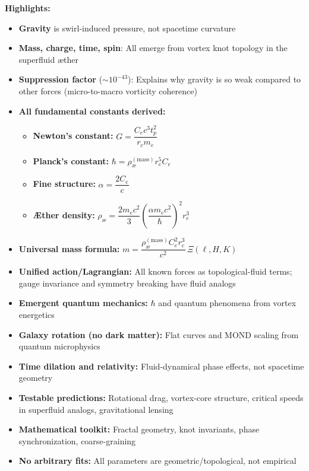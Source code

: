 \documentclass{article}
\begin{document}
\begin{center}
    \begin{multicols}{2}
        \footnotesize
        \textbf{Highlights:}
        \begin{itemize}
            \item \textbf{Gravity} is swirl-induced pressure, not spacetime curvature
            \item \textbf{Mass, charge, time, spin}: All emerge from vortex knot topology in the superfluid æther
            \item \textbf{Suppression factor} ($\sim 10^{-43}$): Explains why gravity is so weak compared to other forces (micro-to-macro vorticity coherence)
            \item \textbf{All fundamental constants derived:}
            \begin{itemize}
                \item \textbf{Newton's constant:} $G = \dfrac{C_e c^3 t_p^2}{r_c m_e}$
                \item \textbf{Planck's constant:} $\hbar = \rho_{\text{\ae}}^{(\text{mass})} r_c^5 C_e$
                \item \textbf{Fine structure:} $\alpha = \dfrac{2 C_e}{c}$
                \item \textbf{Æther density:} $\rho_{\text{\ae}} = \dfrac{2 m_e c^2}{3} \left(\dfrac{\alpha m_e c^2}{\hbar}\right)^2 r_e^3$
            \end{itemize}
            \item \textbf{Universal mass formula:} $m = \dfrac{\rho_{\text{\ae}}^{(\text{mass})} C_e^2 r_c^3}{c^2} \, \Xi(\ell, H, K)$
            \item \textbf{Unified action/Lagrangian:} All known forces as topological-fluid terms; gauge invariance and symmetry breaking have fluid analogs
            \item \textbf{Emergent quantum mechanics:} $\hbar$ and quantum phenomena from vortex energetics
            \item \textbf{Galaxy rotation (no dark matter):} Flat curves and MOND scaling from quantum microphysics
            \item \textbf{Time dilation and relativity:} Fluid-dynamical phase effects, not spacetime geometry
            \item \textbf{Testable predictions:} Rotational drag, vortex-core structure, critical speeds in superfluid analogs, gravitational lensing
            \item \textbf{Mathematical toolkit:} Fractal geometry, knot invariants, phase synchronization, coarse-graining
            \item \textbf{No arbitrary fits:} All parameters are geometric/topological, not empirical
        \end{itemize}
    \end{multicols}
    \end{center}
\end{document}
